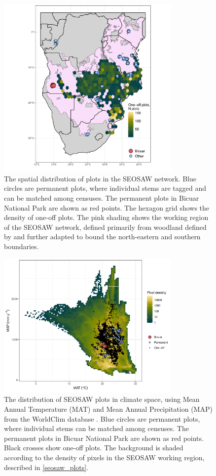 \begin{refsection}
\begin{figure}[H]
\centering
	\includegraphics[width=0.8\textwidth]{img/seosaw_plots}
	\caption{The spatial distribution of plots in the SEOSAW network. Blue circles are permanent plots, where individual stems are tagged and can be matched among censuses. The permanent plots in Bicuar National Park are shown as red points. The hexagon grid shows the density of one-off plots.  The pink shading shows the working region of the SEOSAW network, defined primarily from woodland defined by \citet{White1983} and further adapted to bound the north-eastern and southern boundaries.}
	\label{seosaw_plots}
\end{figure}

\begin{figure}[H]
\centering
	\includegraphics[width=0.8\textwidth]{img/seosaw_clim}
	\caption{The distribution of SEOSAW plots in climate space, using Mean Annual Temperature (MAT) and Mean Annual Precipitation (MAP) from the WorldClim database \citep{Fick2017}. Blue circles are permanent plots, where individual stems can be matched among censuses. The permanent plots in Bicuar National Park are shown as red points. Black crosses show one-off plots. The background is shaded according to the density of pixels in the SEOSAW working region, described in \autoref{seosaw_plots}.}
	\label{seosaw_clim}
\end{figure}


\end{refsection}
